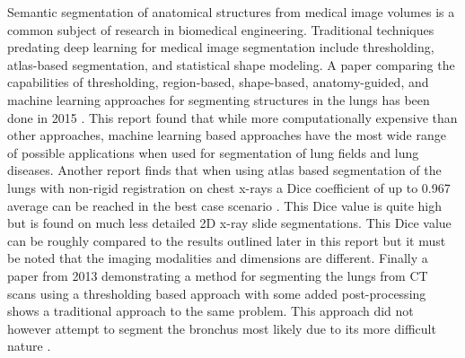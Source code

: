 
Semantic segmentation of anatomical structures from medical image volumes is a common subject of research in biomedical engineering. Traditional techniques predating deep learning for medical image segmentation include thresholding, atlas-based segmentation, and statistical shape modeling. A paper comparing the capabilities of thresholding, region-based, shape-based, anatomy-guided, and machine learning approaches for segmenting structures in the lungs has been done in 2015 \cite{comparison:article_typical}. This report found that while more computationally expensive than other approaches, machine learning based approaches have the most wide range of possible applications when used for segmentation of lung fields and lung diseases.
Another report finds that when using atlas based segmentation of the lungs with non-rigid registration on chest x-rays a Dice coefficient of up to 0.967 average can be reached in the best case scenario \cite{atlas}. This Dice value is quite high but is found on much less detailed 2D x-ray slide segmentations. This Dice value can be roughly compared to the results outlined later in this report but it must be noted that the imaging modalities and dimensions are different.
Finally a paper from 2013 demonstrating a method for segmenting the lungs from CT scans using a thresholding based approach with some added post-processing shows a traditional approach to the same problem. This approach did not however attempt to segment the bronchus most likely due to its more difficult nature \cite{threshold}.